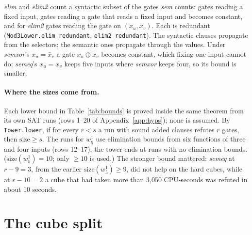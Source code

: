\documentclass[11pt]{article}
\newcommand{\size}{\mathrm{size}}
\newcommand{\lean}[1]{\texttt{#1}}
\begin{document}
\emph{elim} and \emph{elim2} count a syntactic subset of the gates \emph{sem} counts: gates reading a fixed
input, gates reading a gate that reads a fixed input and becomes constant, and for \emph{elim2} gates reading the
gate on $(x_u,x_v)$. Each is redundant (\lean{Mod3Lower.elim\_redundant}, \lean{elim2\_redundant}). The
syntactic clauses propagate from the selectors; the semantic ones propagate through the values. Under \emph{semxor}'s
$x_u=\bar x_v$ a gate $x_u\oplus x_v$ becomes constant, which fixing one input cannot do; \emph{semeq}'s
$x_u=x_v$ keeps five inputs where \emph{semxor} keeps four, so its bound is smaller.

\paragraph{Where the sizes come from.} Each lower bound in Table~\ref{tab:bounds} is proved inside
the same theorem from its own SAT runs (rows 1--20 of Appendix~\ref{app:hyps}); none is assumed. By \lean{Tower.lower}, if for
every $r<s$ a run with sound added clauses refutes $r$ gates, then $\size\ge s$. The runs for $w^1_5$ use
elimination bounds from six functions of three and four inputs (rows 12--17); the tower ends at runs with no elimination bounds.
($\size(w^1_5)=10$; only $\ge10$ is used.) The stronger bound mattered: \emph{semeq} at $r-9=3$,
from the earlier $\size(w^1_5)\ge9$, did not help on the hard cubes, while at $r-10=2$ a cube that had taken more
than 3{,}050 CPU-seconds was refuted in about 10 seconds.

\section{The cube split}\label{sec:cubes}
\end{document}
